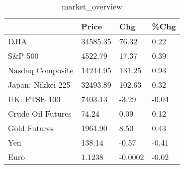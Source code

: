 \documentclass{article}%
\begin{document}
%


\begin{table}[htbp]%
\caption{market\_overview}%
\centering%
\begin{adjustbox}{width=1\textwidth}%
\begin{tabular}{llll}
\toprule
                  &    Price &     Chg &  \%Chg \\
\midrule
             DJIA & 34585.35 &   76.32 &  0.22 \\
          S\&P 500 &  4522.79 &   17.37 &  0.39 \\
 Nasdaq Composite & 14244.95 &  131.25 &  0.93 \\
Japan: Nikkei 225 & 32493.89 &  102.63 &  0.32 \\
     UK: FTSE 100 &  7403.13 &   -3.29 & -0.04 \\
Crude Oil Futures &    74.24 &    0.09 &  0.12 \\
     Gold Futures &  1964.90 &    8.50 &  0.43 \\
              Yen &   138.14 &   -0.57 & -0.41 \\
             Euro &   1.1238 & -0.0002 & -0.02 \\
\bottomrule
\end{tabular}
%
\end{adjustbox}%
\end{table}

%
\end{document}
